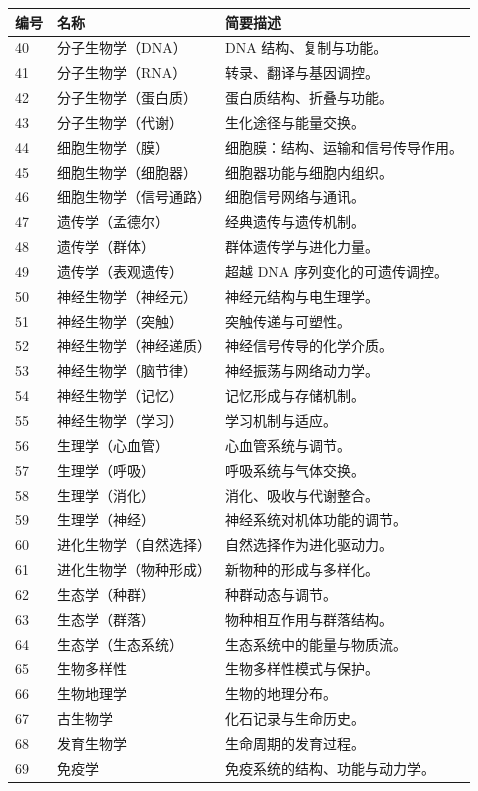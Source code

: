 \documentclass[11pt,a4paper]{article}
\begin{document}
	\begin{longtable}{|p{0.9cm}|p{6.0cm}|p{8.6cm}|}
		\hline
		\textbf{编号} & \textbf{名称} & \textbf{简要描述} \\
		\hline
		\endhead
		40 & 分子生物学（DNA） & DNA 结构、复制与功能。 \\
		41 & 分子生物学（RNA） & 转录、翻译与基因调控。 \\
		42 & 分子生物学（蛋白质） & 蛋白质结构、折叠与功能。 \\
		43 & 分子生物学（代谢） & 生化途径与能量交换。 \\
		44 & 细胞生物学（膜） & 细胞膜：结构、运输和信号传导作用。 \\
		45 & 细胞生物学（细胞器） & 细胞器功能与细胞内组织。 \\
		46 & 细胞生物学（信号通路） & 细胞信号网络与通讯。 \\
		47 & 遗传学（孟德尔） & 经典遗传与遗传机制。 \\
		48 & 遗传学（群体） & 群体遗传学与进化力量。 \\
		49 & 遗传学（表观遗传） & 超越 DNA 序列变化的可遗传调控。 \\
		50 & 神经生物学（神经元） & 神经元结构与电生理学。 \\
		51 & 神经生物学（突触） & 突触传递与可塑性。 \\
		52 & 神经生物学（神经递质） & 神经信号传导的化学介质。 \\
		53 & 神经生物学（脑节律） & 神经振荡与网络动力学。 \\
		54 & 神经生物学（记忆） & 记忆形成与存储机制。 \\
		55 & 神经生物学（学习） & 学习机制与适应。 \\
		56 & 生理学（心血管） & 心血管系统与调节。 \\
		57 & 生理学（呼吸） & 呼吸系统与气体交换。 \\
		58 & 生理学（消化） & 消化、吸收与代谢整合。 \\
		59 & 生理学（神经） & 神经系统对机体功能的调节。 \\
		60 & 进化生物学（自然选择） & 自然选择作为进化驱动力。 \\
		61 & 进化生物学（物种形成） & 新物种的形成与多样化。 \\
		62 & 生态学（种群） & 种群动态与调节。 \\
		63 & 生态学（群落） & 物种相互作用与群落结构。 \\
		64 & 生态学（生态系统） & 生态系统中的能量与物质流。 \\
		65 & 生物多样性 & 生物多样性模式与保护。 \\
		66 & 生物地理学 & 生物的地理分布。 \\
		67 & 古生物学 & 化石记录与生命历史。 \\
		68 & 发育生物学 & 生命周期的发育过程。 \\
		69 & 免疫学 & 免疫系统的结构、功能与动力学。 \\
		\hline
	\end{longtable}
	
\end{document}
